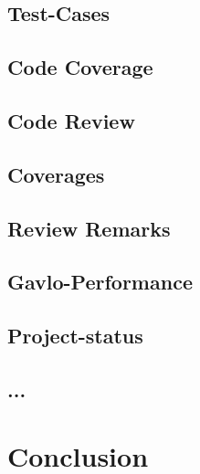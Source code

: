 \documentclass[master,english,smartquotes,apa]{hgbthesis}
\begin{document}
		\section{Test-Cases}
		\section{Code Coverage}
		\section{Code Review}
		\section{Coverages}
		\section{Review Remarks}
		\section{Gavlo-Performance}
		\section{Project-status}
		\section{ ... }
	\chapter{Conclusion}
	\label{cha:Conclusion}


% 
% 
% 
% 
% 

\appendix                                                             %


\backmatter                           %



\MakeBibliography %


% 

\end{document}
